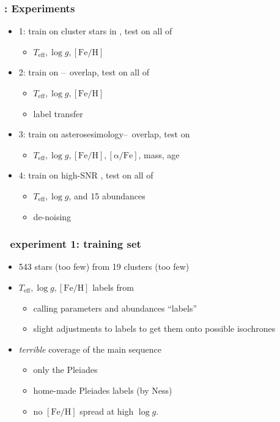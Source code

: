 \documentclass[pdftex]{beamer}
\newcommand{\teff}{T_{\mathrm{eff}}}
\newcommand{\logg}{\log g}
\newcommand{\feh}{[\mathrm{Fe / H}]}
\newcommand{\alphafe}{[\mathrm{\alpha / Fe}]}
\begin{document}
\begin{frame}
  \frametitle{\tc: Experiments}
  \begin{itemize}
  \item 1: train on cluster stars in \apogee, test on all of \apogee
    \begin{itemize}
    \item $\teff, \logg, \feh$
    \end{itemize}
  \item 2: train on \lamost--\apogee\ overlap, test on all of \lamost
    \begin{itemize}
    \item $\teff, \logg, \feh$
    \item label transfer
    \end{itemize}
  \item 3: train on asterosesimology--\apogee\ overlap, test on \apogee
    \begin{itemize}
    \item $\teff, \logg, \feh, \alphafe$, mass, age
    \end{itemize}
  \item 4: train on high-SNR \apogee, test on all of \apogee
    \begin{itemize}
    \item $\teff, \logg$, and 15 abundances
    \item de-noising
    \end{itemize}
  \end{itemize}
\end{frame}

\begin{frame}
  \frametitle{\tc\ experiment 1: training set}
  \begin{itemize}
  \item 543 stars (too few) from 19 clusters (too few)
  \item $\teff, \logg, \feh$ labels from \apogee
    \begin{itemize}
    \item calling parameters and abundances ``labels''
    \item slight adjustments to labels to get them onto possible isochrones
    \end{itemize}
  \item \emph{terrible} coverage of the main sequence
    \begin{itemize}
    \item only the Pleiades
    \item home-made Pleiades labels (by Ness)
    \item no $\feh$ spread at high $\logg$.
    \end{itemize}
  \end{itemize}
\end{frame}
\end{document}
